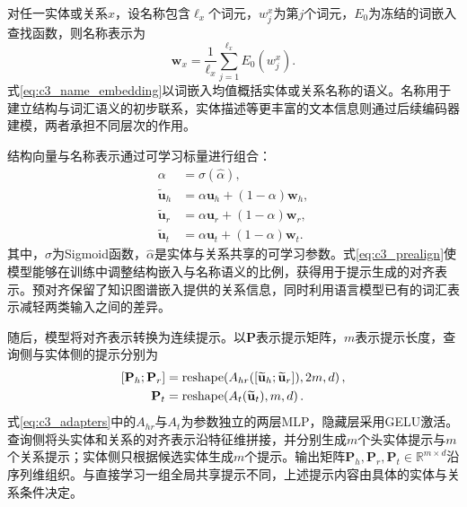 对任一实体或关系$x$，设名称包含$\ell_x$个词元，$w_j^x$为第$j$个词元，$E_0$为冻结的词嵌入查找函数，则名称表示为
\begin{equation}
    \mathbf{w}_x=\frac{1}{\ell_x}\sum_{j=1}^{\ell_x}E_0(w_j^x).
    \label{eq:c3_name_embedding}
\end{equation}
式\eqref{eq:c3_name_embedding}以词嵌入均值概括实体或关系名称的语义。名称用于建立结构与词汇语义的初步联系，实体描述等更丰富的文本信息则通过后续编码器建模，两者承担不同层次的作用。

结构向量与名称表示通过可学习标量进行组合：
\begin{equation}
\begin{aligned}
    \alpha&=\sigma(\hat\alpha),\\
    \widetilde{\mathbf{u}}_h&=\alpha\mathbf{u}_h+(1-\alpha)\mathbf{w}_h,\\
    \widetilde{\mathbf{u}}_r&=\alpha\mathbf{u}_r+(1-\alpha)\mathbf{w}_r,\\
    \widetilde{\mathbf{u}}_t&=\alpha\mathbf{u}_t+(1-\alpha)\mathbf{w}_t.
\end{aligned}
    \label{eq:c3_prealign}
\end{equation}
其中，$\sigma$为Sigmoid函数，$\hat\alpha$是实体与关系共享的可学习参数。式\eqref{eq:c3_prealign}使模型能够在训练中调整结构嵌入与名称语义的比例，获得用于提示生成的对齐表示。预对齐保留了知识图谱嵌入提供的关系信息，同时利用语言模型已有的词汇表示减轻两类输入之间的差异。

随后，模型将对齐表示转换为连续提示。以$\mathbf{P}$表示提示矩阵，$m$表示提示长度，查询侧与实体侧的提示分别为
\begin{equation}
\begin{aligned}
    \relax[\mathbf{P}_h;\mathbf{P}_r]
       &=\operatorname{reshape}\!\left(A_{hr}([\widetilde{\mathbf{u}}_h;
           \widetilde{\mathbf{u}}_r]),2m,d\right),\\
    \mathbf{P}_t&=\operatorname{reshape}\!\left(A_t(\widetilde{\mathbf{u}}_t),m,d\right).
\end{aligned}
    \label{eq:c3_adapters}
\end{equation}
式\eqref{eq:c3_adapters}中的$A_{hr}$与$A_t$为参数独立的两层MLP，隐藏层采用GELU激活。查询侧将头实体和关系的对齐表示沿特征维拼接，并分别生成$m$个头实体提示与$m$个关系提示；实体侧只根据候选实体生成$m$个提示。输出矩阵$\mathbf{P}_h,\mathbf{P}_r,\mathbf{P}_t\in\mathbb{R}^{m\times d}$沿序列维组织。与直接学习一组全局共享提示不同\cite{lester2021power}，上述提示内容由具体的实体与关系条件决定。

